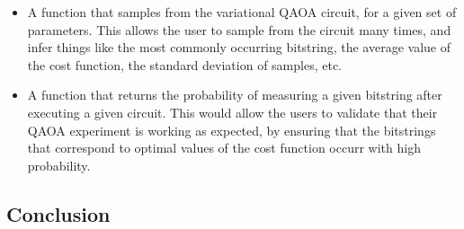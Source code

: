 \documentclass{article}
\begin{document}
\begin{itemize}
	\item A function that samples from the variational QAOA circuit, for 
		a given set of parameters. This allows the user to sample from the 
		circuit many times, and infer things like the most commonly occurring 
		bitstring, the average value of the cost function, the standard deviation 
		of samples, etc.
	\item A function that returns the probability of measuring a given bitstring after executing 
		a given circuit. This would allow the users to validate that their QAOA experiment is working
		as expected, by ensuring that the bitstrings that correspond to optimal values of the cost 
		function occurr with high probability.
\end{itemize}

\subsection{Conclusion}

\printbibliography
\end{document}
